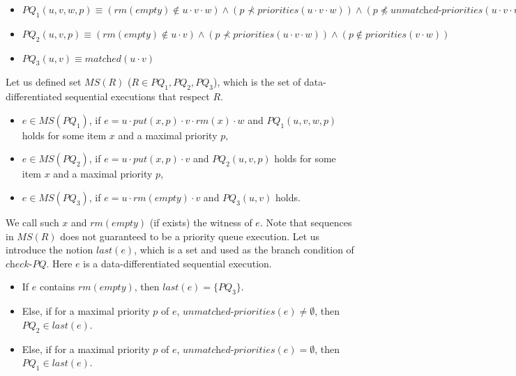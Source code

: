 \begin{itemize}
\setlength{\itemsep}{0.5pt}
\item[-] $\textit{PQ}_1(u,v,w,p) \equiv
(\textit{rm}(\textit{empty}) \notin u \cdot v \cdot w) \wedge
(p \not\prec \textit{priorities}(u \cdot v \cdot w)) \wedge
(p \not\preceq \textit{unmatched-priorities}(u \cdot v \cdot w)) \wedge
(\textit{matched}_{\prec}(u \cdot v,p) ) \wedge
(p \notin \textit{priorities}(v \cdot w))$

\item[-] $\textit{PQ}_2(u,v,p) \equiv
(\textit{rm}(\textit{empty}) \notin u \cdot v) \wedge
(p \not\prec \textit{priorities}(u \cdot v \cdot w)) \wedge
(p \notin \textit{priorities}(v \cdot w))$

\item[-] $\textit{PQ}_3(u,v) \equiv
\textit{matched}(u \cdot v)$
\end{itemize}


Let us defined set $\textit{MS}(R)$ ($R \in \textit{PQ}_1,\textit{PQ}_2,\textit{PQ}_3$), which is the set of data-differentiated sequential executions that respect $R$.

\begin{itemize}
\setlength{\itemsep}{0.5pt}
\item[-] $e \in \textit{MS}(\textit{PQ}_1)$, if $e = u \cdot \textit{put}(x,p) \cdot v \cdot \textit{rm}(x) \cdot w$ and $\textit{PQ}_1(u,v,w,p)$ holds for some item $x$ and a maximal priority $p$,

\item[-] $e \in \textit{MS}(\textit{PQ}_2)$, if $e = u \cdot \textit{put}(x,p) \cdot v$ and $\textit{PQ}_2(u,v,p)$ holds for some item $x$ and a maximal priority $p$,

\item[-] $e \in \textit{MS}(\textit{PQ}_3)$, if $e = u \cdot \textit{rm}(\textit{empty}) \cdot v$ and $\textit{PQ}_3(u,v)$ holds.
\end{itemize}

We call such $x$ and $\textit{rm}(\textit{empty})$ (if exists) the witness of $e$. Note that sequences in $\textit{MS}(R)$ does not guaranteed to be a priority queue execution. Let us introduce the notion $\textit{last}(e)$, which is a set and used as the branch condition of $\textit{check-PQ}$. Here $e$ is a data-differentiated sequential execution.

\begin{itemize}
\setlength{\itemsep}{0.5pt}
\item[-] If $e$ contains $\textit{rm}(\textit{empty})$, then $\textit{last}(e) = \{ \textit{PQ}_3 \}$.

\item[-] Else, if for a maximal priority $p$ of $e$, $\textit{unmatched-priorities}(e) \neq \emptyset$, then $\textit{PQ}_2 \in \textit{last}(e)$.

\item[-] Else, if for a maximal priority $p$ of $e$, $\textit{unmatched-priorities}(e) = \emptyset$, then $\textit{PQ}_1 \in \textit{last}(e)$.
\end{itemize}

